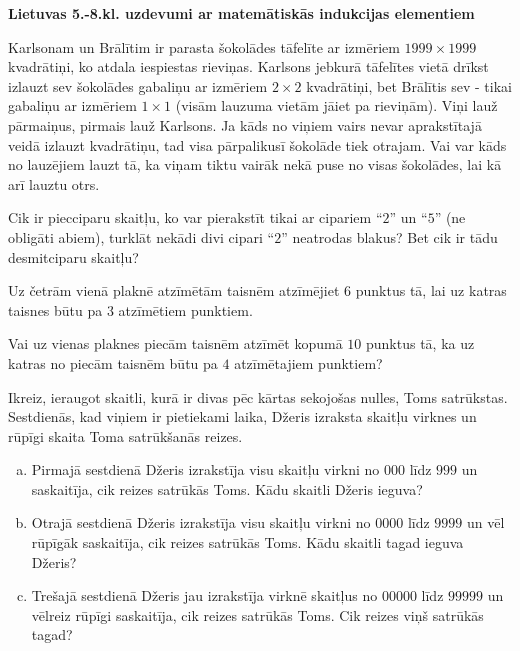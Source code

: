 \documentclass[11pt]{article}
\begin{document}
\begin{center}
{\Large \bf Lietuvas 5.-8.kl. uzdevumi ar matemātiskās indukcijas elementiem}
\end{center}

\begin{problem}[LT.58.1999.5to7.4]
Karlsonam un Brālītim ir parasta šokolādes tāfelīte ar izmēriem $1999 \times 1999$ kvadrātiņi, 
ko atdala iespiestas rieviņas. Karlsons jebkurā tāfelītes vietā drīkst izlauzt sev
šokolādes gabaliņu ar izmēriem $2 \times 2$ kvadrātiņi, 
bet Brālītis sev - tikai gabaliņu ar izmēriem $1 \times 1$ (visām lauzuma vietām 
jāiet pa rieviņām). Viņi lauž pārmaiņus, pirmais lauž Karlsons. 
Ja kāds no viņiem vairs nevar aprakstītajā veidā izlauzt kvadrātiņu, tad
visa pārpalikusī šokolāde tiek otrajam. Vai var kāds no lauzējiem lauzt tā, 
ka viņam tiktu vairāk nekā puse no visas šokolādes, lai kā arī lauztu otrs. 
\end{problem}


\begin{problem}[LT.58.2003.7to8.1]
Cik ir piecciparu skaitļu, ko var pierakstīt tikai ar cipariem ``$2$'' un ``$5$''
(ne obligāti abiem), turklāt nekādi divi cipari ``$2$'' neatrodas blakus? 
Bet cik ir tādu desmitciparu skaitļu?
\end{problem}

\begin{problem}[LT.58.2005.5to6.2]
Uz četrām vienā plaknē atzīmētām taisnēm atzīmējiet $6$ punktus tā, lai 
uz katras taisnes būtu pa $3$ atzīmētiem punktiem.
\end{problem}

\begin{problem}[LT.58.2005.7to8.1]
Vai uz vienas plaknes piecām taisnēm atzīmēt kopumā $10$ punktus tā, 
ka uz katras no piecām taisnēm būtu pa $4$ atzīmētajiem punktiem? 
\end{problem}

\begin{problem}[LT.58.2008.5to6.3]
Ikreiz, ieraugot skaitli, kurā ir divas pēc kārtas sekojošas nulles, Toms 
satrūkstas. Sestdienās, kad viņiem ir pietiekami laika, Džeris izraksta 
skaitļu virknes un rūpīgi skaita Toma satrūkšanās reizes.
\begin{enumerate}[(a)]
\item Pirmajā sestdienā Džeris izrakstīja visu skaitļu 
virkni no $000$ līdz $999$ un saskaitīja, cik reizes satrūkās Toms. Kādu 
skaitli Džeris ieguva? 
\item Otrajā sestdienā Džeris izrakstīja visu skaitļu virkni 
no $0000$ līdz $9999$ un vēl rūpīgāk saskaitīja, cik reizes satrūkās Toms. 
Kādu skaitli tagad ieguva Džeris?
\item Trešajā sestdienā Džeris jau izrakstīja virknē skaitļus no 
$00000$ līdz $99999$ un vēlreiz rūpīgi saskaitīja, cik reizes satrūkās Toms. 
Cik reizes viņš satrūkās tagad?
\end{enumerate}
\end{problem}
\end{document}
